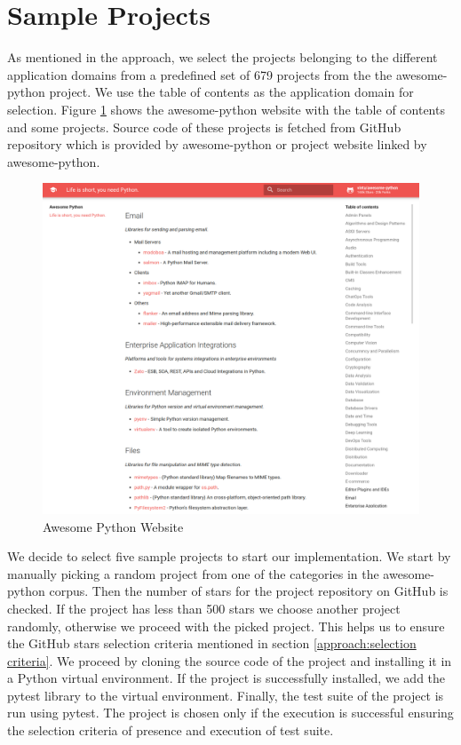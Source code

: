 \section{Sample Projects}
\label{impl:Sample Projects}
As mentioned in the approach, we select the projects belonging to the different application domains from a predefined set of 679 projects from the the awesome-python project.
We use the table of contents as the application domain for selection.
Figure \ref{fig:awesome-python-website} shows the awesome-python website with the table of contents and some projects.
Source code of these projects is fetched from GitHub repository which is provided by awesome-python or project website linked by awesome-python.  
\begin{figure}
    \centering
    \includegraphics[width=1\linewidth, height=1\linewidth]{figures/implementation/Awesome-Python-website3.png}
    \caption{Awesome Python Website}
    \label{fig:awesome-python-website}
\end{figure}

We decide to select five sample projects to start our implementation.
We start by manually picking a random project from one of the categories in the awesome-python corpus.
Then the number of stars for the project repository on GitHub is checked.
If the project has less than 500 stars we choose another project randomly, otherwise we proceed with the picked project.
This helps us to ensure the GitHub stars selection criteria mentioned in section \ref{approach:selection criteria}.
We proceed by cloning the source code of the project and installing it in a Python virtual environment.
If the project is successfully installed, we add the pytest library to the virtual environment.
Finally, the test suite of the project is run using pytest. 
The project is chosen only if the execution is successful ensuring the selection criteria of presence and execution of test suite.

